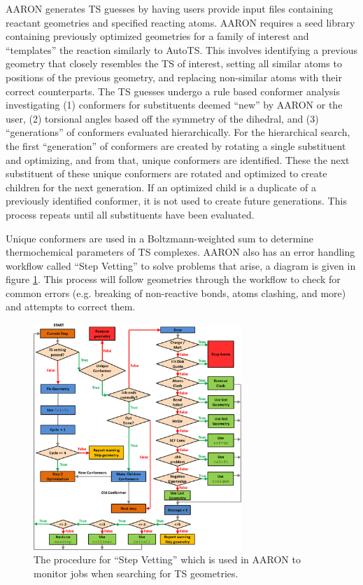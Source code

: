 \documentclass[preprint, 11pt]{elsarticle} %
\begin{document}
AARON generates TS guesses by having users provide input files containing reactant geometries and specified reacting atoms.
AARON requires a seed library containing previously optimized geometries for a family of interest and ``templates'' the reaction similarly to AutoTS.
This involves identifying a previous geometry that closely resembles the TS of interest, setting all similar atoms to positions of the previous geometry, and replacing non-similar atoms with their correct counterparts.
The TS guesses undergo a rule based conformer analysis investigating (1) conformers for substituents  deemed ``new'' by AARON or the user, (2) torsional angles based off the symmetry of the dihedral, and (3) ``generations'' of conformers evaluated hierarchically.
For the hierarchical search, the first ``generation'' of conformers are created by rotating a single substituent and optimizing, and from that, unique conformers are identified.
These the next substituent of these unique conformers are rotated and optimized to create children for the next generation. 
If an optimized child is a duplicate of a previously identified conformer, it is not used to create future generations.
This process repeats until all substituents have been evaluated. 

Unique conformers are used in a Boltzmann-weighted sum to determine thermochemical parameters of TS complexes. 
AARON also has an error handling workflow called ``Step Vetting'' to solve problems that arise, a diagram is given in figure \ref{fig:aaron_exception}.
This process will follow geometries through the workflow to check for common errors (e.g. breaking of non-reactive bonds, atoms clashing, and more) and attempts to correct them.

\begin{figure}
    \centering
    \includegraphics[width=0.7\textwidth]{aaron_exception.png}
    \caption{The procedure for ``Step Vetting'' which is used in AARON to monitor jobs when searching for TS geometries.}
    \label{fig:aaron_exception}
\end{figure}
\end{document}
